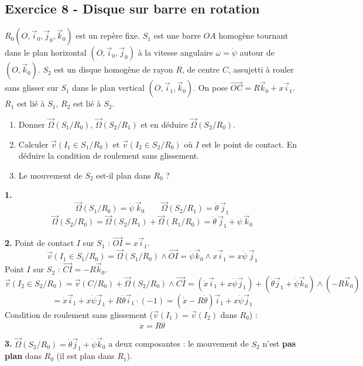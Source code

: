 \documentclass[12pt,a4paper]{article}
\begin{document}
\subsection*{Exercice 8 - Disque sur barre en rotation \niveau{\difficile}}

\begin{boiteexercice}
$R_0(O,\vec{i}_0,\vec{j}_0,\vec{k}_0)$ est un repère fixe. $S_1$ est une barre $OA$ homogène tournant dans le plan horizontal $(O,\vec{i}_0,\vec{j}_0)$ à la vitesse angulaire $\omega = \dot{\psi}$ autour de $(O,\vec{k}_0)$. $S_2$ est un disque homogène de rayon $R$, de centre $C$, assujetti à rouler sans glisser sur $S_1$ dans le plan vertical $(O,\vec{i}_1,\vec{k}_0)$. On pose $\overrightarrow{OC} = R\vec{k}_0 + x\vec{i}_1$. $R_1$ est lié à $S_1$, $R_2$ est lié à $S_2$.
\begin{enumerate}
  \item Donner $\vec{\Omega}(S_1/R_0)$, $\vec{\Omega}(S_2/R_1)$ et en déduire $\vec{\Omega}(S_2/R_0)$.
  \item Calculer $\vec{v}(I_1\in S_1/R_0)$ et $\vec{v}(I_2\in S_2/R_0)$ où $I$ est le point de contact. En déduire la condition de roulement sans glissement.
  \item Le mouvement de $S_2$ est-il plan dans $R_0$ ?
\end{enumerate}
\end{boiteexercice}

\begin{boitecorrige}
\textbf{1.}
\[
\vec{\Omega}(S_1/R_0) = \dot{\psi}\,\vec{k}_0 \qquad \vec{\Omega}(S_2/R_1) = \dot{\theta}\,\vec{j}_1
\]
\[
\vec{\Omega}(S_2/R_0) = \vec{\Omega}(S_2/R_1) + \vec{\Omega}(R_1/R_0) = \dot{\theta}\,\vec{j}_1 + \dot{\psi}\,\vec{k}_0
\]

\textbf{2.} Point de contact $I$ sur $S_1$ : $\overrightarrow{OI} = x\vec{i}_1$.
\[
\vec{v}(I_1\in S_1/R_0) = \vec{\Omega}(S_1/R_0)\wedge\overrightarrow{OI} = \dot{\psi}\vec{k}_0\wedge x\vec{i}_1 = x\dot{\psi}\,\vec{j}_1
\]
Point $I$ sur $S_2$ : $\overrightarrow{CI} = -R\vec{k}_0$.
\[
\vec{v}(I_2\in S_2/R_0) = \vec{v}(C/R_0) + \vec{\Omega}(S_2/R_0)\wedge\overrightarrow{CI} = (\dot{x}\vec{i}_1 + x\dot{\psi}\vec{j}_1) + (\dot{\theta}\vec{j}_1+\dot{\psi}\vec{k}_0)\wedge(-R\vec{k}_0)
\]
\[
= \dot{x}\vec{i}_1 + x\dot{\psi}\vec{j}_1 + R\dot{\theta}\vec{i}_1 \cdot (-1) = (\dot{x}-R\dot{\theta})\vec{i}_1 + x\dot{\psi}\vec{j}_1
\]
Condition de roulement sans glissement ($\vec{v}(I_1)=\vec{v}(I_2)$ dans $R_0$) :
\[
\boxed{\dot{x} = R\dot{\theta}}
\]

\textbf{3.} $\vec{\Omega}(S_2/R_0) = \dot{\theta}\vec{j}_1 + \dot{\psi}\vec{k}_0$ a deux composantes : le mouvement de $S_2$ n'est \textbf{pas plan} dans $R_0$ (il est plan dans $R_1$).
\end{boitecorrige}
\end{document}
